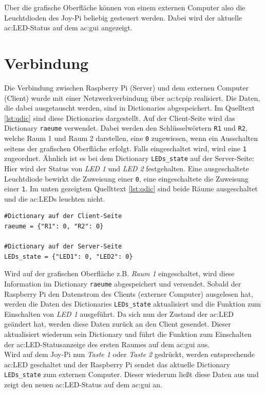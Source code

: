 Über die grafische Oberfläche können von einem externen Computer also die Leuchtdioden des Joy-Pi beliebig gesteuert werden. Dabei wird der aktuelle \gls{ac:LED}-Status auf dem \gls{ac:gui} angezeigt.  



\section{Verbindung}
Die Verbindung zwischen Raspberry Pi (Server) und dem externen Computer (Client) wurde mit einer Netzwerkverbindung über \gls{ac:tcpip} realisiert. Die Daten, die dabei ausgetauscht werden, sind in Dictionaries abgespeichert. Im Quelltext \ref{lst:qdic} sind diese Dictionaries dargestellt. Auf der Client-Seite wird das Dictionary \texttt{raeume} verwendet. Dabei werden den Schlüsselwörtern \texttt{R1} und \texttt{R2}, welche Raum 1 und Raum 2 darstellen, eine \texttt{0} zugewiesen, wenn ein Ausschalten seitens der grafischen Oberfläche erfolgt. Falls eingeschaltet wird, wird eine \texttt{1} zugeordnet. Ähnlich ist es bei dem Dictionary \texttt{LEDs\_state} auf der Server-Seite: Hier wird der Status von \textit{LED 1} und \textit{LED 2} festgehalten. Eine ausgeschaltete Leuchtdiode bewirkt die Zuweisung einer \texttt{0}, eine eingeschaltete die Zuweisung einer \texttt{1}. Im unten gezeigtem Quellttext \ref{lst:qdic} sind beide Räume ausgeschaltet und die \gls{ac:LED}s leuchten nicht.

\begin{lstlisting}[style=python, caption=Python-Code der verwendeten Dictionaries, label=lst:qdic]
#Dictionary auf der Client-Seite
raeume = {"R1": 0, "R2": 0}

#Dictionary auf der Server-Seite
LEDs_state = {"LED1": 0, "LED2": 0}
\end{lstlisting}

Wird auf der grafischen Oberfläche z.B. \textit{Raum 1} eingeschaltet, wird diese Information im Dictionary \texttt{raeume} abgespeichert und versendet. Sobald der Raspberry Pi den Datenstrom des Clients (externer Computer) ausgelesen hat, werden die Daten des Dictionaries \texttt{LEDs\_state} aktualisiert und die Funktion zum Einschalten von \textit{LED 1} ausgeführt. Da sich nun der Zustand der \gls{ac:LED} geändert hat, werden diese Daten zurück an den Client gesendet. Dieser aktualisiert wiederum sein Dictionary und führt die Funktion zum Einschalten der \gls{ac:LED}-Statusanzeige des ersten Raumes auf dem \gls{ac:gui} aus.\\
Wird auf dem Joy-Pi nun \textit{Taste 1} oder \textit{Taste 2} gedrückt, werden entsprechende \gls{ac:LED} geschaltet und der Raspberry Pi sendet das aktuelle Dictionary \texttt{LEDs\_state} zum externen Computer. Dieser wiederum ließt diese Daten aus und zeigt den neuen \gls{ac:LED}-Status auf dem \gls{ac:gui} an.
